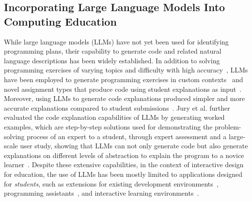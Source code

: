 \subsection{Incorporating Large Language Models Into Computing Education}

While large language models (LLMs) have not yet been used for identifying programming plans, their capability to generate code and related natural language descriptions has been widely established. In addition to solving programming exercises of varying topics and difficulty with high accuracy~\cite{finnie-ansleyRobotsAreComing2022, finnie-ansleyMyAIWants2023, wangExploringRoleAI2023}, LLMs have been employed to generate programming exercises in custom contexts~\cite{sarsaAutomaticGenerationProgramming2022b, logachevaEvaluatingContextuallyPersonalized2024} and novel assignment types that produce code using student explanations as input~\cite{dennyPromptProblemsNew2024, dennyExplainingCodePurpose2024}. Moreover, using LLMs to generate code explanations produced simpler and more accurate explanations compared to student submissions~\cite{leinonenComparingCodeExplanations2023}. Jury et al. further evaluated the code explanation capabilities of LLMs by generating worked examples, which are step-by-step solutions used for demonstrating the problem-solving process of an expert to a student, through expert assessment and a large-scale user study, showing that LLMs can not only generate code but also generate explanations on different levels of abstraction to explain the program to a novice learner~\cite{juryEvaluatingLLMgeneratedWorked2024a}. Despite these extensive capabilities, in the context of interactive design for education, the use of LLMs has been mostly limited to applications designed for \textit{students}, such as extensions for existing development environments~\cite{ferdowsiValidatingAIGeneratedCode2024, yanIvieLightweightAnchored2024, liTutorlyTurningProgramming2018}, programming assistants~\cite{kazemitabaarCodeAidEvaluatingClassroom2024, liffitonCodeHelpUsingLarge2024, yangDebuggingAITutor2024}, and interactive learning environments~\cite{jinTeachAIHow2024}.

